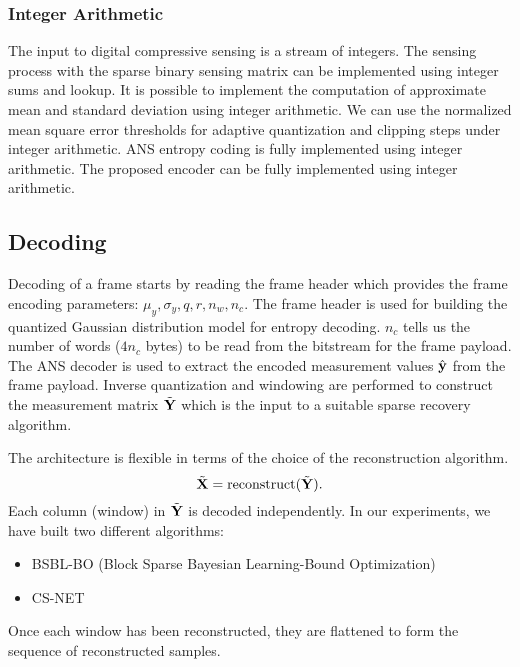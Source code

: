 \subsubsection{Integer Arithmetic}
The input to digital compressive sensing is a stream of integers.
The sensing process with
the sparse binary sensing matrix can be implemented
using integer sums and lookup.
It is possible to implement the computation of
approximate mean and standard deviation
using integer arithmetic.
We can use the normalized mean square error thresholds
for adaptive quantization and clipping steps under integer arithmetic.
ANS entropy coding is fully implemented using integer arithmetic.
The proposed encoder can be fully implemented using integer arithmetic.


\subsection{Decoding}
Decoding of a frame starts by reading the frame header
which provides the frame encoding parameters:
$\mu_y, \sigma_y, q, r, n_w, n_c$.
The frame header is used for building
the quantized Gaussian distribution model
for entropy decoding.
$n_c$ tells us the number of words ($4 n_c$ bytes) to be
read from the bitstream for the frame payload.
The ANS decoder is used to extract the encoded measurement
values $\hat{\mathbf{y}}$ from the frame payload.
Inverse quantization and windowing are performed
to construct the measurement matrix $\tilde{\mathbf{Y}}$
which is the input to a suitable sparse recovery algorithm.

The architecture is flexible in terms of the choice of the
reconstruction algorithm.
\begin{equation}
\tilde{\mathbf{X}} = \mathrm{reconstruct}(\tilde{\mathbf{Y}}).
\end{equation}
Each column (window) in $\tilde{\mathbf{Y}}$ is decoded independently.
In our experiments, we have built two different algorithms:
\begin{itemize}
  \item BSBL-BO (Block Sparse Bayesian Learning-Bound Optimization)
  \cite{zhang2013extension,zhang2012compressed,zhang2016comparison}
  \item CS-NET \cite{zhang2021csnet}
\end{itemize}
Once each window has been reconstructed, they are flattened
to form the sequence of reconstructed samples.

